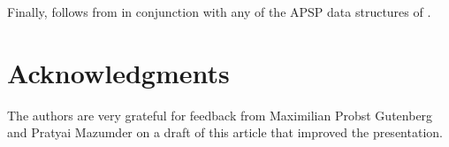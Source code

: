 \documentclass[11pt]{article}
\begin{document}
Finally,  follows from  in conjunction with any of the APSP data structures of \cite{CZ23, kyng2023dynamic, haeupler2024dynamicdeterministicconstantapproximatedistance}. 

\section*{Acknowledgments}

The authors are very grateful for feedback from Maximilian Probst Gutenberg and Pratyai Mazumder on a draft of this article that improved the presentation.  

\newpage


\end{document}
